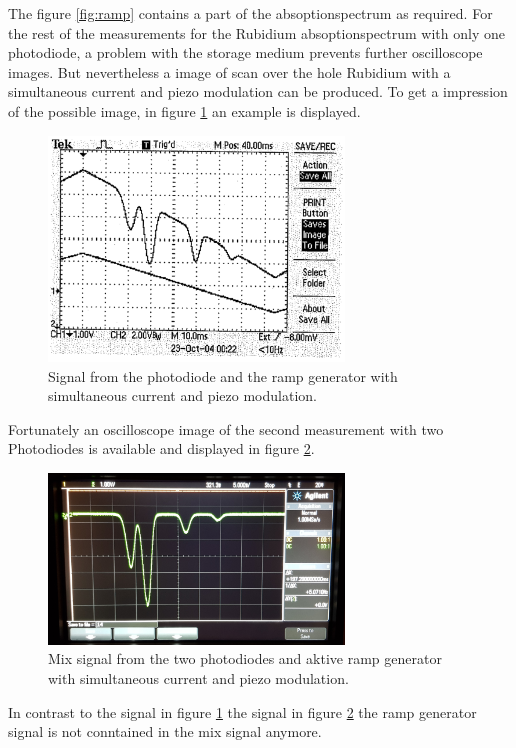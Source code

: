 The figure \ref{fig:ramp} contains a part of the
absoptionspectrum as required.
For the rest of the measurements for the Rubidium absoptionspectrum
with only one photodiode, a problem with the storage medium
prevents further oscilloscope images.
But nevertheless
a image of scan over the hole Rubidium
with a simultaneous current and piezo modulation
can be produced. To get a impression of the possible image,
in figure \ref{fig:theory_curve} an example is displayed.

\begin{figure}
  \centering
  \includegraphics[width = 0.7\textwidth]{Rb_modulation.png}
  \caption{Signal from the photodiode and the ramp generator with
  simultaneous current and piezo modulation. \cite{V60}}
  \label{fig:theory_curve}
\end{figure}

Fortunately an oscilloscope image of the second measurement
with two Photodiodes
is available and displayed in figure \ref{fig:2dioden}.

\begin{figure}
  \centering
  \includegraphics[width = 0.7\textwidth]{./figures/Rb_spectrum.jpg}
  \caption{Mix signal from the two photodiodes and aktive ramp generator with
  simultaneous current and piezo modulation.}
  \label{fig:2dioden}
\end{figure}

In contrast to the signal in figure \ref{fig:theory_curve}
the signal in figure \ref{fig:2dioden} the
ramp generator signal is not conntained in the mix signal anymore.

